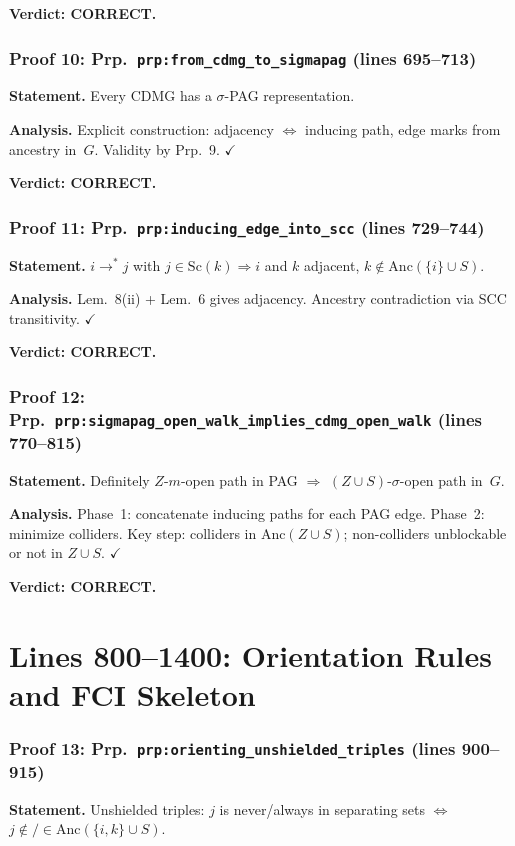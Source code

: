 \documentclass{article}
\begin{document}
\textbf{Verdict: CORRECT.}

\section{Proof 10: Prp.\ \texttt{prp:from\_cdmg\_to\_sigmapag} (lines 695--713)}
\textbf{Statement.} Every CDMG has a $\sigma$-PAG representation.

\textbf{Analysis.} Explicit construction: adjacency $\iff$ inducing path,
edge marks from ancestry in~$G$.  Validity by Prp.~9.  $\checkmark$

\textbf{Verdict: CORRECT.}

\section{Proof 11: Prp.\ \texttt{prp:inducing\_edge\_into\_scc} (lines 729--744)}
\textbf{Statement.} $i\to^*j$ with $j\in\mathrm{Sc}(k)\Rightarrow i$ and $k$ adjacent,
$k\notin\mathrm{Anc}(\{i\}\cup S)$.

\textbf{Analysis.} Lem.~8(ii) + Lem.~6 gives adjacency.  Ancestry contradiction
via SCC transitivity.  $\checkmark$

\textbf{Verdict: CORRECT.}

\section{Proof 12: Prp.\ \texttt{prp:sigmapag\_open\_walk\_implies\_cdmg\_open\_walk}
(lines 770--815)}
\textbf{Statement.} Definitely $Z$-$m$-open path in PAG $\Rightarrow$
$(Z\cup S)$-$\sigma$-open path in~$G$.

\textbf{Analysis.} Phase~1: concatenate inducing paths for each PAG edge.
Phase~2: minimize colliders.  Key step: colliders in $\mathrm{Anc}(Z\cup S)$;
non-colliders unblockable or not in $Z\cup S$.  $\checkmark$

\textbf{Verdict: CORRECT.}

\part*{Lines 800--1400: Orientation Rules and FCI Skeleton}

\section{Proof 13: Prp.\ \texttt{prp:orienting\_unshielded\_triples}
(lines 900--915)}
\textbf{Statement.} Unshielded triples: $j$ is never/always in separating sets
$\iff$ $j\notin/\in\mathrm{Anc}(\{i,k\}\cup S)$.
\end{document}
